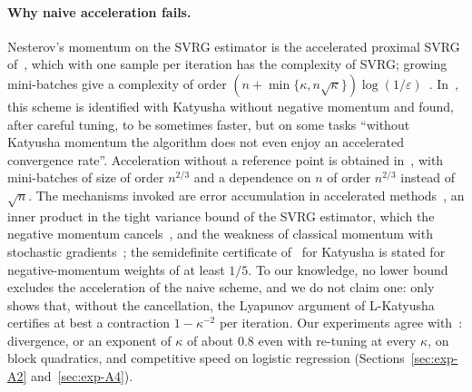 \paragraph{Why naive acceleration fails.}
Nesterov's momentum on the SVRG estimator is the accelerated proximal SVRG of~\cite{nitanda2014stochastic}, which
with one sample per iteration has the complexity of SVRG; growing mini-batches give a complexity of order
$(n+\min\{\kappa,n\sqrt\kappa\})\log(1/\varepsilon)$~\cite{nitanda2016accelerated}. In~\cite{allenzhu2018katyusha},
this scheme is identified with Katyusha without negative momentum and found, after careful tuning, to be sometimes
faster, but on some tasks ``without Katyusha momentum the algorithm does not even enjoy an accelerated convergence
rate''. Acceleration without a reference point is obtained in~\cite{driggs2022accelerating}, with mini-batches of
size of order $n^{2/3}$ and a dependence on $n$ of order $n^{2/3}$ instead of $\sqrt n$. The mechanisms invoked are error
accumulation in accelerated methods~\cite{schmidt2011convergence,devolder2014first}, an inner product in the tight
variance bound of the SVRG estimator, which the negative momentum cancels~\cite{allenzhu2018katyusha,zhou2019direct},
and the weakness of classical momentum with stochastic gradients~\cite{kidambi2018insufficiency}; the semidefinite
certificate of~\cite{hu2018dissipativity} for Katyusha is stated for negative-momentum weights of at least $1/5$.
To our knowledge, no lower bound excludes the acceleration of the naive scheme, and we do not claim one:
 only shows that, without the cancellation, the Lyapunov argument of L-Katyusha certifies at
best a contraction $1-\kappa^{-2}$ per iteration. Our experiments agree
with~\cite{allenzhu2018katyusha}: divergence, or an exponent of $\kappa$ of about $0.8$ even with re-tuning at every
$\kappa$, on block quadratics, and competitive speed on logistic regression (Sections~\ref{sec:exp-A2}
and~\ref{sec:exp-A4}).

